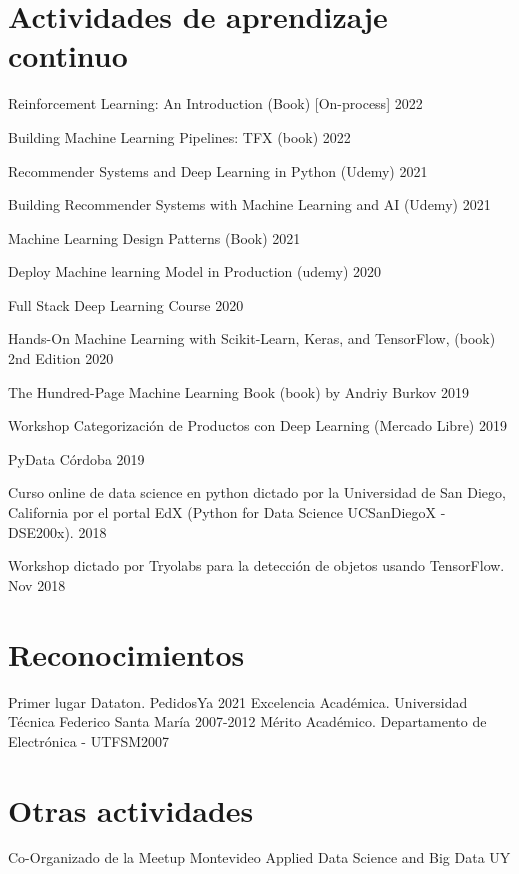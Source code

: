 \documentclass{article}
\renewenvironment{itemize}[1]{\begin{compactitem}#1}{\end{compactitem}}
\begin{document}
	\section{Actividades de aprendizaje continuo}
	\begin{itemize}[-]
		\item Reinforcement Learning: An Introduction (Book) [On-process] \hfill 2022
		\item Building Machine Learning Pipelines: TFX (book) \hfill 2022
		\item Recommender Systems and Deep Learning in Python (Udemy) \hfill 2021
		\item Building Recommender Systems with Machine Learning and AI (Udemy) \hfill 2021
		\item Machine Learning Design Patterns (Book) \hfill 2021
		\item Deploy Machine learning Model in Production (udemy) \hfill 2020
		\item Full Stack Deep Learning Course \hfill 2020
		\item Hands-On Machine Learning with Scikit-Learn, Keras, and TensorFlow, (book) 2nd Edition \hfill 2020
		\item The Hundred-Page Machine Learning Book (book) by Andriy Burkov \hfill 2019   
		\item Workshop Categorización de Productos con Deep Learning (Mercado Libre) \hfill 2019
		\item PyData Córdoba \hfill 2019
		\item Curso online de data science en python dictado por la Universidad de San Diego, California por el portal EdX (Python for Data Science UCSanDiegoX - DSE200x). \hfill 2018
		\item  Workshop dictado por Tryolabs para la detección de objetos usando TensorFlow.  \hfill Nov 2018
		
	\end{itemize}
	
	\section{Reconocimientos}
	\ralewaysb Primer lugar Dataton. \raleway PedidosYa \hfill 2021
	\ralewaysb Excelencia Académica. \raleway Universidad Técnica Federico Santa María \hfill 2007-2012
	\ralewaysb Mérito Académico. \raleway Departamento de Electrónica - UTFSM\hfill 2007
	
	\section{Otras actividades}
	\ralewaysb 	Co-Organizado de la Meetup Montevideo Applied Data Science and Big Data UY
	
	
\end{document}
